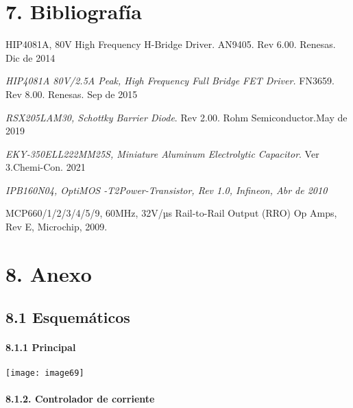 \documentclass{article} %
\begin{document}
\noindent 
\section{\eject }

\noindent 
\section{7. Bibliograf\'{i}a}

\noindent [1] HIP4081A, 80V High Frequency H-Bridge Driver. AN9405. Rev 6.00. Renesas. Dic de 2014

\noindent 

\noindent [2]\textit{ HIP4081A 80V/2.5A Peak, High Frequency Full Bridge FET Driver. }FN3659. Rev 8.00. Renesas. Sep de 2015

\noindent 

\noindent [3] \textit{RSX205LAM30, Schottky Barrier Diode}. Rev 2.00. Rohm Semiconductor.May de 2019

\noindent 

\noindent [4] \textit{EKY-350ELL222MM25S, Miniature Aluminum Electrolytic Capacitor}. Ver 3.Chemi-Con. 2021

\noindent 

\noindent [5]\textit{ IPB160N04, OptiMOS{\circledR} -T2Power-Transistor, Rev 1.0, Infineon, Abr de 2010}

\noindent \textit{}

\noindent [6] MCP660/1/2/3/4/5/9, 60MHz, 32V/µs Rail-to-Rail Output (RRO) Op Amps, Rev E, Microchip, 2009.\textit{}

\noindent 
\section{8. Anexo}

\noindent 
\subsection{8.1  Esquem\'{a}ticos}

\noindent 
\paragraph{8.1.1 Principal}

\noindent \texttt{[image: image69]}

\noindent 

\noindent 
\paragraph{8.1.2. Controlador de corriente}
\end{document}
